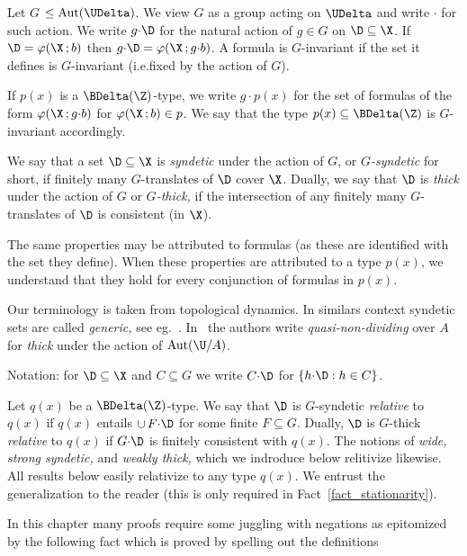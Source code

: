 Let \emph{$G$\/} $\le{\rm Aut}(\UDelta)$.
We view $G$ as a group acting on $\UDelta$ and write ${\cdot}$ for such action.
We write $g{\cdot}\D$ for the natural action of $g\in G$ on $\D\subseteq\X$.
If $\D=\varphi(\X\,;b)$ then $g{\cdot}\D=\varphi(\X\,;g{\cdot}b)$.
A formula is $G$-invariant if the set it defines is $G$-invariant (i.e.\@ fixed by the action of $G$).

If $p(x)$ is a $\BDelta(\Z)$-type, we write $g{\cdot}p(x)$ for the set of formulas of the form $\varphi(\X\,;g{\cdot}b)$ for $\varphi(\X\,;b)\in p$.
We say that the type $p(x)\subseteq\BDelta(\Z)$ is $G$-invariant accordingly.

We say that a set $\D\subseteq\X$ is \emph{syndetic\/} under the action of $G$, or \emph{$G$-syndetic\/} for short, if finitely many $G$-translates of $\D$ cover $\X$.
Dually, we say that $\D$ is \emph{thick\/} under the action of $G$ or \emph{$G$-thick,} if the intersection of any finitely many $G$-translates of $\D$ is consistent (in $\X$).

The same properties may be attributed to formulas (as these are identified with the set they define).
When these properties are attributed to a type $p(x)$, we understand that they hold for every conjunction of formulas in $p(x)$.

Our terminology is taken from topological dynamics.
In similars context syndetic sets are called \textit{generic,} see eg.~\cite{Ne}.
In~\cite{CK} the authors write \textit{quasi-non-dividing\/} over $A$ for \textit{thick\/} under the action of ${\rm Aut}(\U/A)$.

Notation: for $\D\subseteq\X$ and $C\subseteq G$ we write \emph{$C{\cdot}\D$\/} for $\{h{\cdot}\D: h\in C\}$.

\begin{remark}\label{rem_relative}
Let $q(x)$ be a $\BDelta(\Z)$-type.
We say that $\D$ is $G$-syndetic \emph{relative\/} to $q(x)$ if $q(x)$ entails $\cup\,F{\cdot}\D$ for some finite $F\subseteq G$.
Dually, $\D$ is $G$-thick \emph{relative\/} to $q(x)$ if $G{\cdot}\D$ is finitely consistent with $q(x)$.
The notions of \textit{wide,\/} \textit{strong syndetic,\/} and \textit{weakly thick,\/}  which we indroduce below relitivize likewise.
All results below easily relativize to any type $q(x)$.
We entrust the generalization to the reader (this is only required in Fact~\ref{fact_stationarity}).
\end{remark}

In this chapter many proofs require some juggling with negations as epitomized by the following fact which is proved by spelling out the definitions

